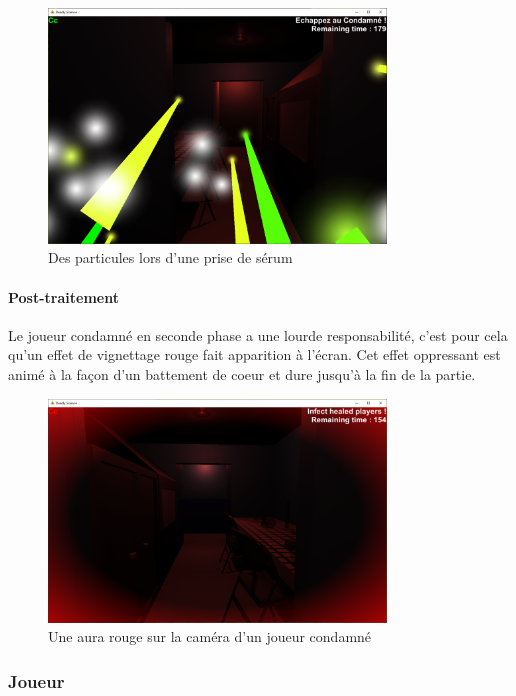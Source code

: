 \documentclass{article}
\begin{document}
\begin{figure}[H]
\centering
\includegraphics[width=0.8\textwidth]{cc/particles_example.png}
\caption{Des particules lors d'une prise de sérum}
\label{cc_c}
\end{figure}


\paragraph{Post-traitement}


Le joueur condamné en seconde phase a une lourde responsabilité, c'est pour cela qu'un effet de vignettage rouge fait apparition à l'écran.
Cet effet oppressant est animé à la façon d'un battement de coeur et dure jusqu'à la fin de la partie.


\begin{figure}[H]
\centering
\includegraphics[width=0.8\textwidth]{cc/post_proc.png}
\caption{Une aura rouge sur la caméra d'un joueur condamné}
\label{cc_d}
\end{figure}


\newpage
\subsubsection{Joueur}
\end{document}
